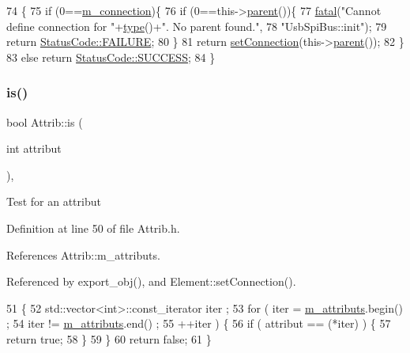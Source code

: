 \begin{DoxyCode}
74                            \{
75   \textcolor{keywordflow}{if} (0==\hyperlink{classElement_abe3de7a5dbbc9a6dd2d7e012e5fdb266}{m\_connection})\{
76     \textcolor{keywordflow}{if} (0==this->\hyperlink{classHierarchy_a1c7bec8257e717f9c1465e06ebf845fc}{parent}())\{
77       \hyperlink{classObject_aad5a16aac7516ce65bd5ec02ab07fc80}{fatal}(\textcolor{stringliteral}{"Cannot define connection for "}+\hyperlink{classObject_a84f99f70f144a83e1582d1d0f84e4e62}{type}()+\textcolor{stringliteral}{". No parent found."},
78           \textcolor{stringliteral}{"UsbSpiBus::init"});
79         \textcolor{keywordflow}{return} \hyperlink{classStatusCode_a6f565cbeadc76d14c72f047e5e85eb4ba3da73d4c469762eb9d3c960368252b26}{StatusCode::FAILURE};
80     \}
81     \textcolor{keywordflow}{return} \hyperlink{classElement_ab476b4b1df5954141ceb14f072433b89}{setConnection}(this->\hyperlink{classHierarchy_a1c7bec8257e717f9c1465e06ebf845fc}{parent}());
82   \}
83   \textcolor{keywordflow}{else} \textcolor{keywordflow}{return} \hyperlink{classStatusCode_a6f565cbeadc76d14c72f047e5e85eb4badd0da38d3ba0d922efd1f4619bc37ad8}{StatusCode::SUCCESS};
84 \}
\end{DoxyCode}
\mbox{\label{classAttrib_a704f26af560909ad22065083bb7d4c34}} 
\subsubsection{\texorpdfstring{is()}{is()}}
{\footnotesize\ttfamily bool Attrib\+::is (\begin{DoxyParamCaption}\item[{int}]{attribut }\end{DoxyParamCaption})\hspace{0.3cm}{\ttfamily [inline]}, {\ttfamily [inherited]}}

Test for an attribut 

Definition at line 50 of file Attrib.\+h.



References Attrib\+::m\+\_\+attributs.



Referenced by export\+\_\+obj(), and Element\+::set\+Connection().


\begin{DoxyCode}
51   \{
52     std::vector<int>::const\_iterator iter ;
53     \textcolor{keywordflow}{for} ( iter  = \hyperlink{classAttrib_ac4bd58a0cc6b38a3b711d609a3d3aacc}{m\_attributs}.begin() ;
54           iter != \hyperlink{classAttrib_ac4bd58a0cc6b38a3b711d609a3d3aacc}{m\_attributs}.end()   ;
55           ++iter ) \{
56       \textcolor{keywordflow}{if} ( attribut == (*iter) ) \{
57         \textcolor{keywordflow}{return} \textcolor{keyword}{true};
58       \}
59     \}
60     \textcolor{keywordflow}{return} \textcolor{keyword}{false};
61   \}
\end{DoxyCode}
\mbox{\label{classUsbSpiBus_af6af49c1ac52cc0586570c1f43d0bc25}} 
